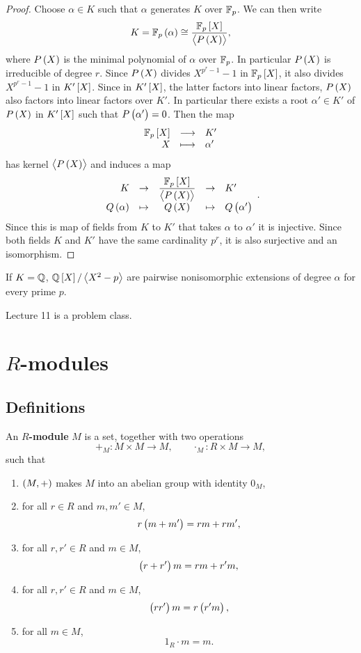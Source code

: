 \begin{proof}
Choose $ \alpha \in K $ such that $ \alpha $ generates $ K $ over $ \mathbb{F}_p $. We can then write
$$ K = \F_p\br{\alpha} \cong \dfrac{\F_p\sbr{X}}{\abr{P\br{X}}}, $$
where $ P\br{X} $ is the minimal polynomial of $ \alpha $ over $ \mathbb{F}_p $. In particular $ P\br{X} $ is irreducible of degree $ r $. Since $ P\br{X} $ divides $ X^{p^r - 1} - 1 $ in $ \F_p\sbr{X} $, it also divides $ X^{p^r - 1} - 1 $ in $ K'\sbr{X} $. Since in $ K'\sbr{X} $, the latter factors into linear factors, $ P\br{X} $ also factors into linear factors over $ K' $. In particular there exists a root $ \alpha' \in K' $ of $ P\br{X} $ in $ K'\sbr{X} $ such that $ P\br{\alpha'} = 0 $. Then the map
$$ \function{\F_p\sbr{X}}{K'}{X}{\alpha'} $$
has kernel $ \abr{P\br{X}} $ and induces a map
$$
\begin{array}{rcccl}
K & \to & \dfrac{\F_p\sbr{X}}{\abr{P\br{X}}} & \to & K' \\
Q\br{\alpha} & \mapsto & Q\br{X} & \mapsto & Q\br{\alpha'}
\end{array}.
$$
Since this is map of fields from $ K $ to $ K' $ that takes $ \alpha $ to $ \alpha' $ it is injective. Since both fields $ K $ and $ K' $ have the same cardinality $ p^r $, it is also surjective and an isomorphism.
\end{proof}

If $ K = \mathbb{Q} $, $ \Q\sbr{X} / \abr{X^2 - p} $ are pairwise nonisomorphic extensions of degree $ \alpha $ for every prime $ p $.


Lecture 11 is a problem class.

\pagebreak

\section{\texorpdfstring{$ R $}{R}-modules}


\subsection{Definitions}

\begin{definition}
An \textbf{$ R $-module} $ M $ is a set, together with two operations
$$ +_M : M \times M \to M, \qquad \cdot_M : R \times M \to M, $$
such that
\begin{enumerate}
\item $ \br{M, +} $ makes $ M $ into an abelian group with identity $ 0_M $,
\item for all $ r \in R $ and $ m, m' \in M $,
$$ r\br{m + m'} = rm + rm', $$
\item for all $ r, r' \in R $ and $ m \in M $,
$$ \br{r + r'}m = rm + r'm, $$
\item for all $ r, r' \in R $ and $ m \in M $,
$$ \br{rr'}m = r\br{r'm}, $$
\item for all $ m \in M $,
$$ 1_R \cdot m = m. $$
\end{enumerate}
\end{definition}

